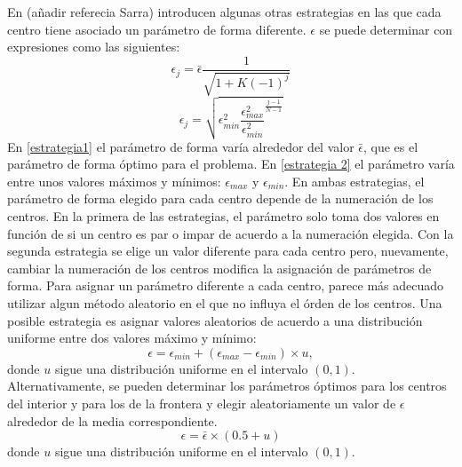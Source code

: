 \documentclass[11pt,a4paper]{article}
\begin{document}
En (añadir referecia Sarra) introducen algunas otras estrategias en las que cada centro tiene asociado un parámetro de forma diferente. $\epsilon$ se puede determinar con expresiones como las siguientes:
\begin{equation}
\epsilon_j=\bar{\epsilon}\dfrac{1}{\sqrt{1+K(-1)^j}}
\label{estrategia1}
\end{equation}
\begin{equation}
\epsilon_j=\sqrt{\epsilon_{min}^2\frac{\epsilon_{max}^2}{\epsilon_{min}^2}^\frac{j-1}{N-1}}
\label{estrategia 2}
\end{equation}
En \ref{estrategia1} el parámetro de forma varía alrededor del valor $\bar{\epsilon}$, que es el parámetro de forma óptimo para el problema. En \ref{estrategia 2} el parámetro varía entre unos valores máximos y mínimos: $\epsilon_{max}$ y $\epsilon_{min}$. En ambas estrategias, el parámetro de forma elegido para cada centro depende de la numeración de los centros. En la primera de las estrategias, el parámetro solo toma dos valores en función de si un centro es par o impar de acuerdo a la numeración elegida. Con la segunda estrategia se elige un valor diferente para cada centro pero, nuevamente, cambiar la numeración de los centros modifica la asignación de parámetros de forma. Para asignar un parámetro diferente a cada centro, parece más adecuado utilizar algun método aleatorio en el que no influya el órden de los centros. Una posible estrategia es asignar valores aleatorios de acuerdo a una distribución uniforme entre dos valores máximo y mínimo:
\begin{equation}
\label{estrategia 3}
\epsilon=\epsilon_{min}+(\epsilon_{max}-\epsilon_{min})\times u,
\end{equation} 
donde $u$ sigue una distribución uniforme en el intervalo $(0,1)$. \\
 Alternativamente, se pueden determinar los parámetros óptimos para los centros del interior y para los de la frontera y elegir aleatoriamente un valor de $\epsilon$ alrededor de la media correspondiente.
\begin{equation}
\label{estrategia 4}
\epsilon=\bar{\epsilon}\times (0.5+u) 
\end{equation}
donde $u$ sigue una distribución uniforme en el intervalo $(0,1)$.\\
\end{document}
